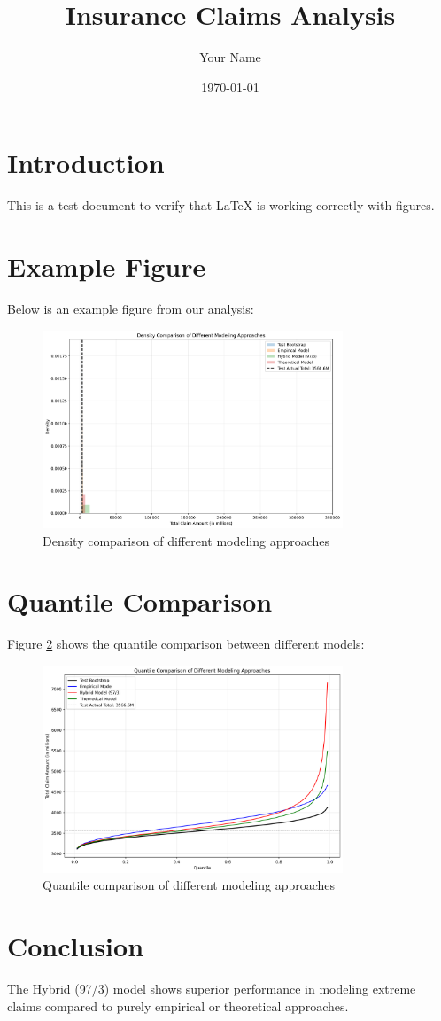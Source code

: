 \documentclass{article}
\title{Insurance Claims Analysis}
\author{Your Name}
\date{\today}
\begin{document}
\maketitle

\section{Introduction}
This is a test document to verify that LaTeX is working correctly with figures.

\section{Example Figure}
Below is an example figure from our analysis:

\begin{figure}[H]
    \centering
    \includegraphics[width=0.8\textwidth]{Figures/model_comparison_density.png}
    \caption{Density comparison of different modeling approaches}
    \label{fig:model_comparison}
\end{figure}

\section{Quantile Comparison}
Figure \ref{fig:quantile_comparison} shows the quantile comparison between different models:

\begin{figure}[H]
    \centering
    \includegraphics[width=0.8\textwidth]{Figures/model_comparison_quantile.png}
    \caption{Quantile comparison of different modeling approaches}
    \label{fig:quantile_comparison}
\end{figure}

\section{Conclusion}
The Hybrid (97/3) model shows superior performance in modeling extreme claims compared to purely empirical or theoretical approaches.
\end{document}
